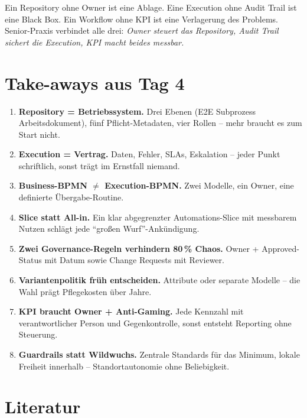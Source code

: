 \documentclass[11pt,a4paper,oneside]{article}
\begin{document}
\begin{merkbox}
Ein Repository ohne Owner ist eine Ablage. Eine Execution ohne Audit Trail ist eine Black Box. Ein Workflow ohne KPI ist eine Verlagerung des Problems. Senior-Praxis verbindet alle drei: \emph{Owner steuert das Repository, Audit Trail sichert die Execution, KPI macht beides messbar.}
\end{merkbox}

\section{Take-aways aus Tag 4}

\begin{enumerate}
  \item \textbf{Repository = Betriebssystem.} Drei Ebenen (E2E \textrightarrow{} Subprozess \textrightarrow{} Arbeitsdokument), fünf Pflicht-Metadaten, vier Rollen -- mehr braucht es zum Start nicht.
  \item \textbf{Execution = Vertrag.} Daten, Fehler, SLAs, Eskalation -- jeder Punkt schriftlich, sonst trägt im Ernstfall niemand.
  \item \textbf{Business-BPMN $\neq$ Execution-BPMN.} Zwei Modelle, ein Owner, eine definierte Übergabe-Routine.
  \item \textbf{Slice statt All-in.} Ein klar abgegrenzter Automations-Slice mit messbarem Nutzen schlägt jede ``großen Wurf''-Ankündigung.
  \item \textbf{Zwei Governance-Regeln verhindern 80\,\% Chaos.} Owner + Approved-Status mit Datum sowie Change Requests mit Reviewer.
  \item \textbf{Variantenpolitik früh entscheiden.} Attribute oder separate Modelle -- die Wahl prägt Pflegekosten über Jahre.
  \item \textbf{KPI braucht Owner + Anti-Gaming.} Jede Kennzahl mit verantwortlicher Person und Gegenkontrolle, sonst entsteht Reporting ohne Steuerung.
  \item \textbf{Guardrails statt Wildwuchs.} Zentrale Standards für das Minimum, lokale Freiheit innerhalb -- Standortautonomie ohne Beliebigkeit.
\end{enumerate}

\clearpage
\section{Literatur}
\end{document}
